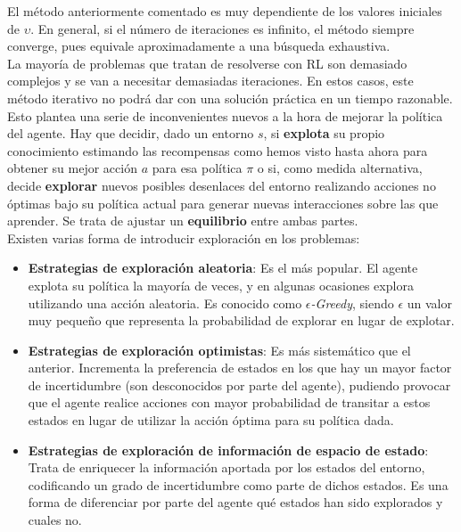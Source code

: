 \documentclass[11pt,fleqn]{book} %
\begin{document}
El método anteriormente comentado es muy dependiente de los valores iniciales de $\upsilon$. En general, si el número de iteraciones es infinito, el método siempre converge, pues equivale aproximadamente a una búsqueda exhaustiva. \\

La mayoría de problemas que tratan de resolverse con RL son demasiado complejos y se van a necesitar demasiadas iteraciones. En estos casos, este método iterativo no podrá dar con una solución práctica en un tiempo razonable.  \\

Esto plantea una serie de inconvenientes nuevos a la hora de mejorar la política del agente. Hay que decidir, dado un entorno $s$, si \textbf{explota} su propio conocimiento estimando las recompensas como hemos visto hasta ahora para obtener su mejor acción $a$ para esa política $\pi$ o si, como medida alternativa, decide \textbf{explorar} nuevos posibles desenlaces del entorno realizando acciones no óptimas bajo su política actual para generar nuevas interacciones sobre las que aprender. Se trata de ajustar un \textbf{equilibrio} entre ambas partes.  \\

Existen varias forma de introducir exploración en los problemas: \\

\begin{itemize}
	\item \textbf{Estrategias de exploración aleatoria}: Es el más popular. El agente explota su política la mayoría de veces, y en algunas ocasiones explora utilizando una acción aleatoria. Es conocido como \textit{$\epsilon$-Greedy}, siendo $\epsilon$ un valor muy pequeño que representa la probabilidad de explorar en lugar de explotar.\\
	
	\item \textbf{Estrategias de exploración optimistas}: Es más sistemático que el anterior. Incrementa la preferencia de estados en los que hay un mayor factor de incertidumbre (son desconocidos por parte del agente), pudiendo provocar que el agente realice acciones con mayor probabilidad de transitar a estos estados en lugar de utilizar la acción óptima para su política dada.\\
	
	\item \textbf{Estrategias de exploración de información de espacio de estado}: Trata de enriquecer la información aportada por los estados del entorno, codificando un grado de incertidumbre como parte de dichos estados. Es una forma de diferenciar por parte del agente qué estados han sido explorados y cuales no.\\
\end{itemize}
\end{document}
